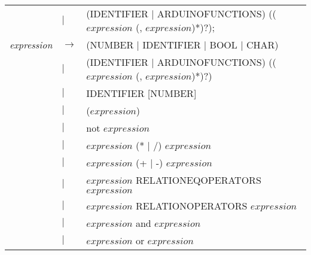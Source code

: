 \begin{table}[htb!]
\begin{tabular}{ll>{\arraybackslash}p{10cm}}
                             & $\mid$ & (IDENTIFIER $\mid$ ARDUINOFUNCTIONS) (($expression$ (, $expression$)*)?);                                                                 \\
        \textit{expression}  & $\to$  & (NUMBER $\mid$ IDENTIFIER $\mid$ BOOL $\mid$ CHAR)                                                                                        \\
                             & $\mid$ & (IDENTIFIER $\mid$ ARDUINOFUNCTIONS) (($expression$ (, $expression$)*)?)                                                                  \\
                             & $\mid$ & IDENTIFIER [NUMBER]                                                                                                                       \\
                             & $\mid$ & ($expression$)                                                                                                                            \\
                             & $\mid$ & not $expression$                                                                                                                          \\
                             & $\mid$ & $expression$ (* $\mid$ /) $expression$                                                                                                    \\
                             & $\mid$ & $expression$ (+ $\mid$ -) $expression$                                                                                                    \\
                             & $\mid$ & $expression$ RELATIONEQOPERATORS $expression$                                                                                             \\
                             & $\mid$ & $expression$ RELATIONOPERATORS $expression$                                                                                               \\
                             & $\mid$ & $expression$ and $expression$                                                                                                             \\
                             & $\mid$ & $expression$ or $expression$                                                                                                              \\
    \end{tabular}
\end{table}

